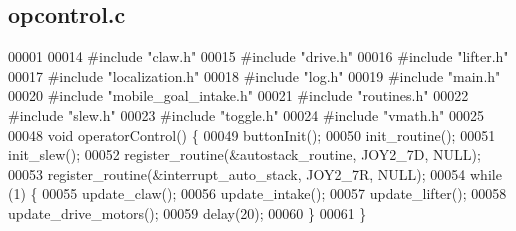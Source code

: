 \subsection{opcontrol.\+c}
\label{opcontrol_8c_source}

\begin{DoxyCode}
00001 
00014 \textcolor{preprocessor}{#include "claw.h"}
00015 \textcolor{preprocessor}{#include "drive.h"}
00016 \textcolor{preprocessor}{#include "lifter.h"}
00017 \textcolor{preprocessor}{#include "localization.h"}
00018 \textcolor{preprocessor}{#include "log.h"}
00019 \textcolor{preprocessor}{#include "main.h"}
00020 \textcolor{preprocessor}{#include "mobile_goal_intake.h"}
00021 \textcolor{preprocessor}{#include "routines.h"}
00022 \textcolor{preprocessor}{#include "slew.h"}
00023 \textcolor{preprocessor}{#include "toggle.h"}
00024 \textcolor{preprocessor}{#include "vmath.h"}
00025 
00048 \textcolor{keywordtype}{void} operatorControl() \{
00049   buttonInit();
00050   init_routine();
00051   init_slew();
00052   register_routine(&autostack_routine, JOY2_7D, NULL);
00053   register_routine(&interrupt_auto_stack, JOY2_7R, NULL);
00054   \textcolor{keywordflow}{while} (1) \{
00055     update_claw();
00056     update_intake();
00057     update_lifter();
00058     update_drive_motors();
00059     delay(20);
00060   \}
00061 \}
\end{DoxyCode}
